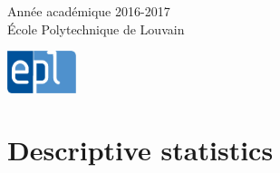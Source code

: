 \documentclass[a4paper]{article}
\begin{document}
\begin{titlepage}

{\large Ann\'ee acad\'emique 2016-2017}\\[0,25cm] 
{\large \'Ecole Polytechnique de Louvain}\\[1cm]


\begin{center}
  \includegraphics[width = 20mm]{img/epl.jpg} \hfill
\end{center}

\vfill %
\end{titlepage}

\tableofcontents

\section{Descriptive statistics}
\end{document}
